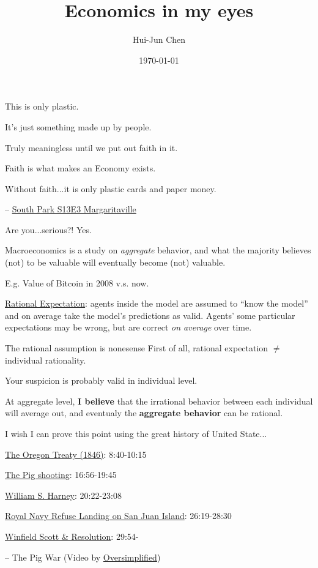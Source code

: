\documentclass{beamer}
\title{Economics in my eyes}
\author{Hui-Jun Chen}
\institute{The Ohio State University}
\date{\today}
\begin{document}
\maketitle

\begin{frame}[standout]
    This is only plastic.

    It's just something made up by people.

    Truly meaningless until we put out faith in it.

    Faith is what makes an Economy exists.

    Without faith...it is only plastic cards and paper money.

    -- \href{https://youtu.be/YWva4HqVVw0}{South Park S13E3 Margaritaville}
\end{frame}

\begin{frame}{Are you...serious?!}
\label{slide:Are_you___serious__}
    Yes.

    Macroeconomics is a study on \textit{aggregate} behavior, and what the majority believes (not) to be valuable will eventually become (not) valuable.

    E.g. Value of Bitcoin in 2008 v.s. now.

    \href{https://en.wikipedia.org/wiki/Rational_expectations}{Rational Expectation}: agents inside the model are assumed to ``know the model'' and on average take the model's predictions as valid.
    Agents' some particular expectations may be wrong, but are correct \textit{on average} over time.
\end{frame}

\begin{frame}{The rational assumption is nonesense}
\label{slide:The_rational_assumption_is_nonesense}
    First of all, rational expectation $ \neq $ individual rationality.

    Your suspicion is probably valid in individual level.

    At aggregate level, \textbf{I believe} that the irrational behavior between each individual will average out, and eventualy the \textbf{aggregate behavior} can be rational.

    I wish I can prove this point using the great history of United State...
\end{frame}

\begin{frame}[standout]

    \href{https://youtu.be/QLq6GEiHqR8?t=520}{The Oregon Treaty (1846)}: 8:40-10:15

    \href{https://youtu.be/QLq6GEiHqR8?t=1016}{The Pig shooting}: 16:56-19:45

    \href{https://youtu.be/QLq6GEiHqR8?t=1213}{William S. Harney}: 20:22-23:08

    \href{https://youtu.be/QLq6GEiHqR8?t=1579}{Royal Navy Refuse Landing on San Juan Island}: 26:19-28:30

    \href{https://youtu.be/QLq6GEiHqR8?t=1794}{Winfield Scott \& Resolution}: 29:54-

    -- The Pig War (Video by \href{https://youtu.be/QLq6GEiHqR8}{Oversimplified})

\end{frame}
\end{document}
